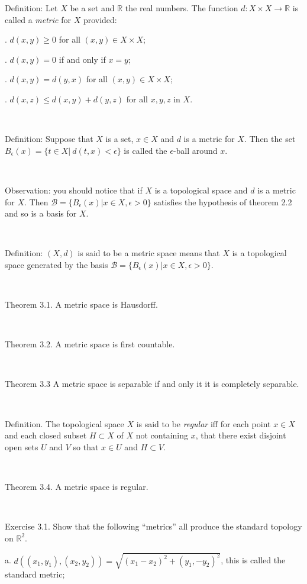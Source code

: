 \documentclass[12pt, std]{article}
\begin{document}
Definition:  Let $X$ be a set and $\mathbb{R}$ the real numbers. The
function $d: X \times X \rightarrow \mathbb{R}$ is called a
\textit{metric} for $X$ provided:

.  $d(x,y) \ge 0$ for all $(x,y) \in X \times X$;

.  $d(x,y) = 0$ if and only if $x=y$;

.  $d(x,y) = d(y,x)$ for all $(x,y) \in X \times X$;

.  $d(x,z) \le d(x,y) + d(y,z)$ for all $x, y, z$ in $X$.

\

Definition: Suppose that $X$ is a set, $x \in X$ and $d$ is a metric
for $X$. Then the set $B_{\epsilon}(x) = \{ t \in X | \ d(t,x) <
\epsilon \}$ is called the $\epsilon$-ball around $x$.

\

Observation: you should notice that if $X$ is a topological space
and $d$ is a metric for $X$. Then
 $\mathcal{B} = \{ B_{\epsilon}(x) | x \in X, \epsilon > 0 \}$
 satisfies the hypothesis of theorem 2.2 and so is a basis for $X$.

 \

Definition: $(X,d)$ is said to be a metric space means that $X$ is a
topological space generated by the basis $\mathcal{B} = \{
B_{\epsilon}(x) | x \in X, \epsilon > 0 \}$.

\

Theorem 3.1.  A metric space is Hausdorff.

\

Theorem 3.2.  A metric space is first countable.

\

Theorem 3.3  A metric space is separable if and only it it is
completely separable.

\

Definition.  The topological space $X$ is said to be
\textit{regular} iff for each point $x \in X$ and each closed subset
$H \subset X$ of $X$ not containing $x$, that there exist disjoint
open sets $U$ and $V$ so that $x \in U$ and $H \subset V$.

\

Theorem 3.4.  A metric space is regular.

\

Exercise 3.1.  Show that the following ``metrics'' all produce the
standard topology on $\mathbb{R}^2$.

\qquad a.  $d((x_1,y_1), (x_2, y_2)) = \sqrt{ (x_1 - x_2)^2 + (y_1,
-y_2)^2}$, this is called the standard metric;
\end{document}
